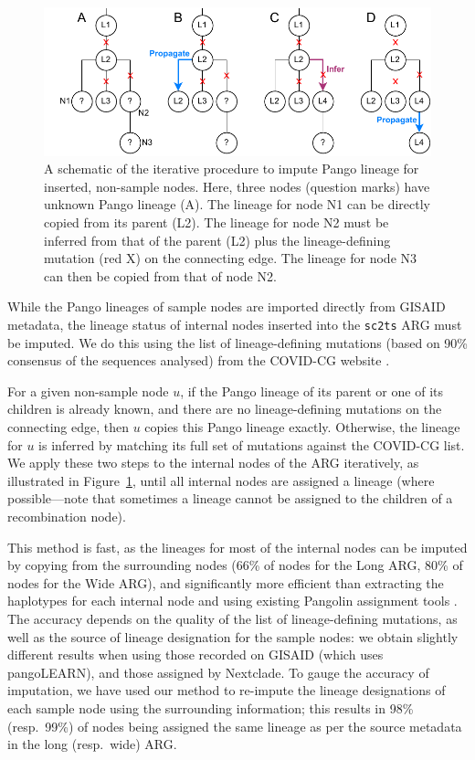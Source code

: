\documentclass{article}
\begin{document}
\begin{figure} \centering
\includegraphics[width=.7\textwidth]{figures/imputation.pdf}
\caption{\label{fig:imputation}A schematic of the iterative procedure to impute
Pango lineage for inserted, non-sample nodes. Here, three nodes (question
marks) have unknown Pango lineage (A). The lineage for node N1 can be directly
copied from its parent (L2). The lineage for node N2 must be inferred from
that of the parent (L2) plus the lineage-defining mutation (red X)
on the connecting edge. The lineage for node N3 can then be copied from
that of node N2.}
\end{figure}
While the Pango lineages of sample nodes are imported directly from
GISAID metadata, the lineage status of internal nodes inserted into
the \texttt{sc2ts} ARG must be imputed. We do this using
the list of lineage-defining mutations (based on 90\% consensus
of the sequences analysed) from the COVID-CG website \citep[][\url{https://covidcg.org/}; accessed on 4 November 2022]{Chen2021-zc}.

For a given non-sample node $u$, if the Pango lineage of its parent or
one of its children is already known, and there are no lineage-defining mutations
on the connecting edge, then $u$ copies this Pango lineage exactly.
Otherwise, the lineage for $u$ is inferred by
matching its full set of mutations against the COVID-CG list.
We apply these two steps to the internal nodes of the ARG iteratively,
as illustrated in Figure~\ref{fig:imputation}, until all internal nodes
are assigned a lineage (where possible---note that sometimes a lineage cannot
be assigned to the children of a recombination node).

This method is fast, as the lineages for most of the internal nodes can be
imputed by copying from the surrounding nodes (66\% of nodes for the Long ARG,
80\% of nodes for the Wide ARG), and significantly more efficient than extracting
the haplotypes for each internal node and using existing Pangolin assignment tools
\citep{OToole2021-assignment}. The
accuracy depends on the quality of the list of lineage-defining mutations,
as well as the source of lineage designation for the sample nodes: we obtain
slightly different results when using those recorded on GISAID (which uses
pangoLEARN), and those assigned by Nextclade. To gauge the accuracy of
imputation, we have used our method to re-impute the lineage designations of each
sample node using the surrounding information; this results in 98\% (resp.~99\%) of
nodes being assigned the same lineage as per the source metadata in the long
(resp.~wide) ARG.
\end{document}
